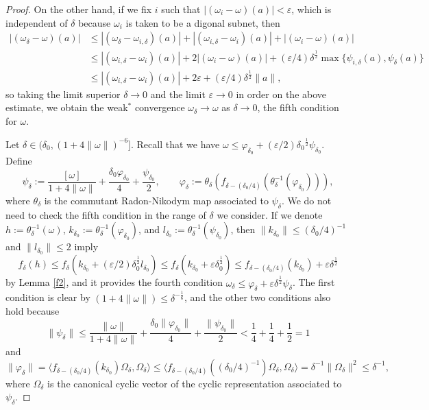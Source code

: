 \documentclass[noamsfonts,a4paper,10pt]{amsart}
\theoremstyle{plain}
\theoremstyle{definition}
\theoremstyle{remark}
\begin{document}
\begin{proof}
On the other hand, if we fix $i$ such that $|(\omega_i-\omega)(a)|<\varepsilon$, which is independent of $\delta$ because $\omega_i$ is taken to be a digonal subnet, then
\begin{align*}
|(\omega_\delta-\omega)(a)|
&\le|(\omega_\delta-\omega_{i,\delta})(a)|+|(\omega_{i,\delta}-\omega_i)(a)|+|(\omega_i-\omega)(a)|\\
&\le|(\omega_{i,\delta}-\omega_i)(a)|+2|(\omega_i-\omega)(a)|+(\varepsilon/4)\delta^\frac12\max\{\psi_{i,\delta}(a),\psi_\delta(a)\}\\
&\le|(\omega_{i,\delta}-\omega_i)(a)|+2\varepsilon+(\varepsilon/4)\delta^{\frac12}\|a\|,
\end{align*}
so taking the limit superior $\delta\to0$ and the limit $\varepsilon\to0$ in order on the above estimate, we obtain the weak$^*$ convergence $\omega_\delta\to\omega$ as $\delta\to0$, the fifth condition for $\omega$.

Let $\delta\in(\delta_0,(1+4\|\omega\|)^{-6}]$.
Recall that we have $\omega\le\varphi_{\delta_0}+(\varepsilon/2){\delta_0}^{\frac12}\psi_{\delta_0}$.
Define
\[\psi_\delta:=\frac{[\omega]}{1+4\|\omega\|}+\frac{\delta_0\varphi_{\delta_0}}4+\frac{\psi_{\delta_0}}2,\qquad\varphi_\delta:=\theta_\delta(f_{\delta-(\delta_0/4)}(\theta_\delta^{-1}(\varphi_{\delta_0}))),\]
where $\theta_\delta$ is the commutant Radon-Nikodym map associated to $\psi_\delta$.
We do not need to check the fifth condition in the range of $\delta$ we consider.
If we denote $h:=\theta_\delta^{-1}(\omega)$, $k_{\delta_0}:=\theta_\delta^{-1}(\varphi_{\delta_0})$, and $l_{\delta_0}:=\theta_\delta^{-1}(\psi_{\delta_0})$, then $\|k_{\delta_0}\|\le(\delta_0/4)^{-1}$ and $\|l_{\delta_0}\|\le2$ imply
\[f_\delta(h)\le f_\delta(k_{\delta_0}+(\varepsilon/2)\delta_0^{\frac12}l_{\delta_0})\le f_\delta(k_{\delta_0}+\varepsilon\delta_0^{\frac12})\le f_{\delta-(\delta_0/4)}(k_{\delta_0})+\varepsilon\delta^\frac12\]
by Lemma \ref{f2}, and it provides the fourth condition $\omega_\delta\le\varphi_\delta+\varepsilon\delta^{\frac12}\psi_\delta$.
The first condition is clear by $(1+4\|\omega\|)\le\delta^{-\frac16}$, and the other two conditions also hold because
\[\|\psi_\delta\|\le\frac{\|\omega\|}{1+4\|\omega\|}+\frac{\delta_0\|\varphi_{\delta_0}\|}4+\frac{\|\psi_{\delta_0}\|}2<\frac14+\frac14+\frac12=1\]
and
\[\|\varphi_\delta\|=\langle f_{\delta-(\delta_0/4)}(k_{\delta_0})\Omega_\delta,\Omega_\delta\rangle\le\langle f_{\delta-(\delta_0/4)}((\delta_0/4)^{-1})\Omega_\delta,\Omega_\delta\rangle=\delta^{-1}\|\Omega_\delta\|^2\le\delta^{-1},\]
where $\Omega_\delta$ is the canonical cyclic vector of the cyclic representation associated to $\psi_\delta$.


\end{proof}
\end{document}
